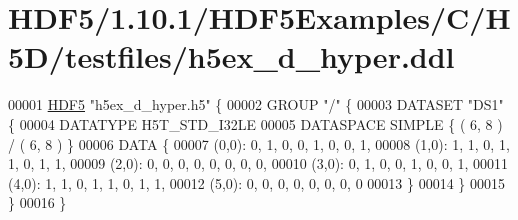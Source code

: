 \hypertarget{_h_d_f5_21_810_81_2_h_d_f5_examples_2_c_2_h5_d_2testfiles_2h5ex__d__hyper_8ddl_source}{}\section{H\+D\+F5/1.10.1/\+H\+D\+F5\+Examples/\+C/\+H5\+D/testfiles/h5ex\+\_\+d\+\_\+hyper.ddl}
\label{_h_d_f5_21_810_81_2_h_d_f5_examples_2_c_2_h5_d_2testfiles_2h5ex__d__hyper_8ddl_source}

\begin{DoxyCode}
00001 \hyperlink{namespace_h_d_f5}{HDF5} \textcolor{stringliteral}{"h5ex\_d\_hyper.h5"} \{
00002 GROUP \textcolor{stringliteral}{"/"} \{
00003    DATASET \textcolor{stringliteral}{"DS1"} \{
00004       DATATYPE  H5T\_STD\_I32LE
00005       DATASPACE  SIMPLE \{ ( 6, 8 ) / ( 6, 8 ) \}
00006       DATA \{
00007       (0,0): 0, 1, 0, 0, 1, 0, 0, 1,
00008       (1,0): 1, 1, 0, 1, 1, 0, 1, 1,
00009       (2,0): 0, 0, 0, 0, 0, 0, 0, 0,
00010       (3,0): 0, 1, 0, 0, 1, 0, 0, 1,
00011       (4,0): 1, 1, 0, 1, 1, 0, 1, 1,
00012       (5,0): 0, 0, 0, 0, 0, 0, 0, 0
00013       \}
00014    \}
00015 \}
00016 \}
\end{DoxyCode}

